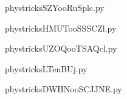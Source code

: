     

    \clearpage
    


    \newcommand{\CaptionFigSZYooRuSplc}{<+Type your caption here+>}
    \begin{center}
        
    \end{center}
    phystricksSZYooRuSplc.py

    

    \clearpage
    


    \newcommand{\CaptionFigHMUTooSSSCZl}{<+Type your caption here+>}
    \begin{center}
        
    \end{center}
    phystricksHMUTooSSSCZl.py

    

    \clearpage
    


    \newcommand{\CaptionFigUZOQooTSAQcl}{<+Type your caption here+>}
    \begin{center}
        
    \end{center}
    phystricksUZOQooTSAQcl.py

    

    \clearpage
    


    \newcommand{\CaptionFigLTenBUj}{<+Type your caption here+>}
    \begin{center}
        
    \end{center}
    phystricksLTenBUj.py

    

    \clearpage
    


    \newcommand{\CaptionFigDWHNooSCJJNE}{<+Type your caption here+>}
    \begin{center}
        
    \end{center}
    phystricksDWHNooSCJJNE.py

    

    \clearpage
    


